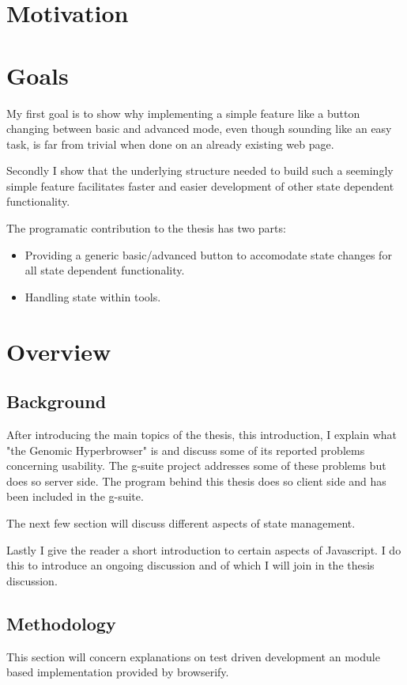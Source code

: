 \documentclass[english]{ifimaster}
\begin{document}
\section{Motivation}%


\section{Goals}
My first goal is to show why implementing a simple feature like a button changing between basic and advanced mode, even though sounding like an easy task, is far from trivial when done on an already existing web page. 

Secondly I show that the underlying structure needed to build such a seemingly simple feature facilitates faster and easier development of other state dependent functionality.

The programatic contribution to the thesis has two parts:
\begin{itemize}
  \item Providing a generic basic/advanced button to accomodate state changes for all state dependent functionality.
  \item Handling state within tools. 
\end{itemize}


\section{Overview}
\subsection{Background}
After introducing the main topics of the thesis, this introduction, I explain what "the Genomic Hyperbrowser" is and discuss some of its reported problems concerning usability. The g-suite project addresses some of these problems but does so server side. The program behind this thesis does so client side and has been included in the g-suite.

The next few section will discuss different aspects of state management. 

Lastly I give the reader a short introduction to certain aspects of Javascript. I do this to introduce an ongoing discussion and of which I will join in the thesis discussion.
\subsection{Methodology}
This section will concern explanations on test driven development an module based implementation provided by browserify.
\end{document}
